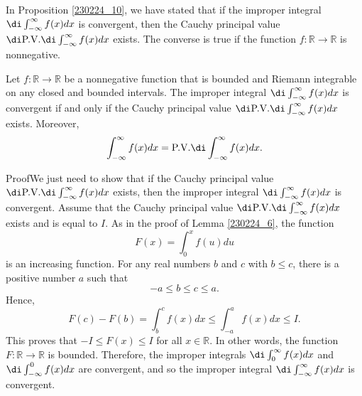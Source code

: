 \begin{example}[label=20230527]{}
In Proposition \ref{230224_10}, we have stated that if the improper integral $\di\int_{-\infty}^{\infty}f(x)dx$ is convergent, then the Cauchy principal value $\di \text{P.V.} \di\int_{-\infty}^{\infty}f(x)dx$  exists. The converse is true if the function $f:\mathbb{R}\to\mathbb{R}$ is nonnegative.
\begin{theorem}{}
Let $f:\mathbb{R}\to\mathbb{R}$ be a nonnegative function that is bounded and Riemann integrable on any closed and bounded intervals. The improper integral $\di\int_{-\infty}^{\infty}f(x)dx$ is convergent if and only if the Cauchy principal value $\di \text{P.V.} \di\int_{-\infty}^{\infty}f(x)dx$  exists. Moreover, 
\[\int_{-\infty}^{\infty}f(x)dx=\text{P.V.} \di\int_{-\infty}^{\infty}f(x)dx.\]

\end{theorem}
\begin{myproof}{Proof}We just need to show that if the Cauchy principal value $\di \text{P.V.} \di\int_{-\infty}^{\infty}f(x)dx$  exists, then the improper integral $\di\int_{-\infty}^{\infty}f(x)dx$ is convergent.\bp
Assume that the Cauchy principal value $\di \text{P.V.} \di\int_{-\infty}^{\infty}f(x)dx$  exists and is equal to $I$. As in the proof of Lemma \ref{230224_6}, the function 
\[F(x)=\int_{0}^xf(u)du\]  is an increasing function.  For any real numbers $b$ and $c$ with $b\leq c$, there is a positive number $a$ such that
\[-a\leq b\leq c\leq a.\]Hence,
\[F(c) -F(b)=\int_b^cf(x)dx\leq\int_{-a}^af(x)dx \leq I.\]
This proves that $-I\leq F(x)\leq I$ for all $x\in \mathbb{R}$. In other words, the function $F:\mathbb{R}\to\mathbb{R}$ is bounded. Therefore, the improper integrals $\di\int_0^{\infty}f(x)dx$ and  $\di\int_{-\infty}^0f(x)dx$ are convergent, and so the improper integral $\di\int_{-\infty}^{\infty}f(x)dx$ is convergent.
\end{myproof}


\end{example}
